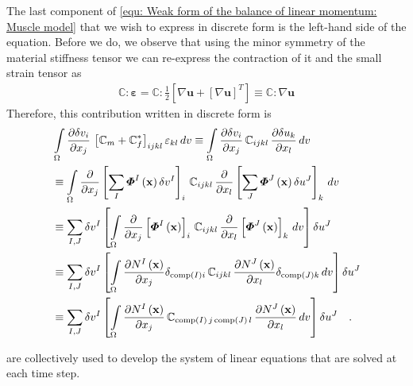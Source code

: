 \documentclass[]{scrartcl}
\begin{document}
The last component of \cref{equ: Weak form of the balance of linear momentum: Muscle model} that we wish to express in discrete form is the left-hand side of the equation.
Before we do, we observe that using the minor symmetry of the material stiffness tensor we can re-express the contraction of it and the small strain tensor as
\begin{gather}
\boldsymbol{\mathbb{C}} : \boldsymbol{\varepsilon}
  = \boldsymbol{\mathbb{C}} : \frac{1}{2} \left[ \nabla \mathbf{u} + \left[ \nabla \mathbf{u} \right]^{T} \right]
  \equiv \boldsymbol{\mathbb{C}} : \nabla \mathbf{u}
\end{gather}
Therefore, this contribution written in discrete form is
\begin{align}
&\int\limits_{\Omega} \frac{\partial \delta v_{i}}{\partial x_{j}} \, \left[ \boldsymbol{\mathbb{C}}_{m} + \boldsymbol{\mathbb{C}}_{f}^{\ast} \right]_{ijkl} \varepsilon_{kl} \, dv
  \equiv \int\limits_{\Omega} \frac{\partial \delta v_{i}}{\partial x_{j}} \, \mathbb{C}_{ijkl} \, \frac{\partial \delta u_{k}}{\partial x_{l}} \, dv \notag\\
  &\equiv \int\limits_{\Omega} \frac{\partial}{\partial x_{j}} \left[ \sum\limits_{I} \boldsymbol{\varPhi}^{I} \left( \mathbf{x} \right) \delta v^{I} \right]_{i} \, \mathbb{C}_{ijkl} \, \frac{\partial}{\partial x_{l}} \left[ \sum\limits_{J} \boldsymbol{\varPhi}^{J} \left( \mathbf{x} \right) \delta u^{J} \right]_{k} \, dv \notag\\
  &\equiv \sum\limits_{I,J} \delta v^{I} \left[ \int\limits_{\Omega} \frac{\partial}{\partial x_{j}} \left[  \boldsymbol{\varPhi}^{I} \left( \mathbf{x} \right)  \right]_{i} \, \mathbb{C}_{ijkl} \, \frac{\partial}{\partial x_{l}} \left[ \boldsymbol{\varPhi}^{J} \left( \mathbf{x} \right)  \right]_{k} \, dv \right] \delta u^{J} \notag\\
  &\equiv \sum\limits_{I,J} \delta v^{I} \left[ \int\limits_{\Omega} \frac{\partial N^{I} \left( \mathbf{x} \right)}{\partial x_{j}} \delta_{\textnormal{comp}(I) i}  \, \mathbb{C}_{ijkl} \, \frac{\partial  N^{J} \left( \mathbf{x} \right)}{\partial x_{l}} \delta_{\textnormal{comp}(J) k} \, dv \right] \delta u^{J} \notag\\
  &\equiv \sum\limits_{I,J} \delta v^{I} \left[ \int\limits_{\Omega} \frac{\partial N^{I} \left( \mathbf{x} \right)}{\partial x_{j}}  \, \mathbb{C}_{\textnormal{comp}(I) \,j \, \textnormal{comp}(J) \, l} \, \frac{\partial  N^{J} \left( \mathbf{x} \right)}{\partial x_{l}} \, dv \right] \delta u^{J}
\label{equ: Discretisation: Material tangent}
\quad .
\end{align}

 are collectively used to develop the system of linear equations that are solved at each time step.


 
\end{document}
